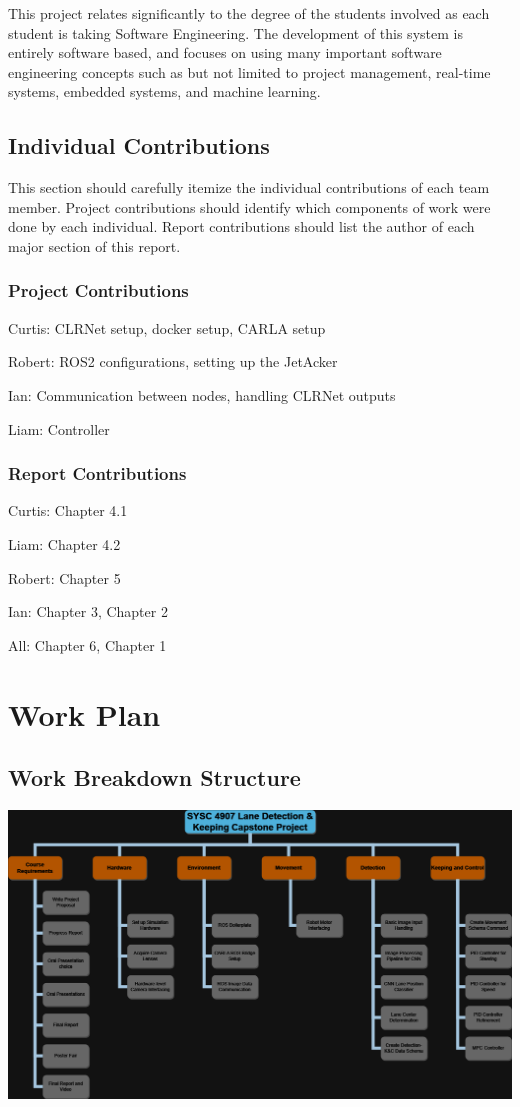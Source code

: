 \documentclass[titlepage]{article}
\begin{document}
This project relates significantly to the degree of the students involved as each student is taking Software Engineering. The development of this system is entirely software based, and focuses on using many important software engineering concepts such as but not limited to project management, real-time systems, embedded systems, and machine learning. 


\subsection{Individual Contributions}
This section should carefully itemize the individual contributions of each team member. Project contributions should identify which components of work were done by each  individual. Report contributions should list the author of  each major section of this report.

\subsubsection{Project Contributions}

Curtis: CLRNet setup, docker setup, CARLA setup

Robert: ROS2 configurations, setting up the JetAcker

Ian: Communication between nodes, handling CLRNet outputs

Liam: Controller

\subsubsection{Report Contributions}

Curtis: Chapter 4.1

Liam: Chapter 4.2

Robert: Chapter 5

Ian: Chapter 3, Chapter 2

All: Chapter 6, Chapter 1

\section{Work Plan}
\subsection{Work Breakdown Structure}
\includegraphics{wbs.png}
\end{document}
